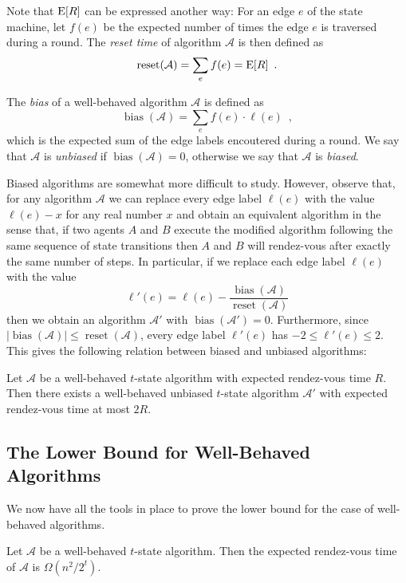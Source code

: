 \documentclass{patmorin}
\newcommand{\A}{\mathcal{A}}
\DeclareMathOperator{\bias}{bias}
\DeclareMathOperator{\reset}{reset}
\begin{document}
Note that $\mathrm{E}[R]$ can be expressed another way: For an edge $e$ of the
state machine, let $f(e)$ be the expected number of times the edge $e$
is traversed during a round.  The
\emph{reset time} of algorithm $\A$ is then defined as
\[
   \reset(\A) = \sum_e f(e) = \E[R] \enspace .
\]

The \emph{bias} of a well-behaved algorithm $\A$ is defined as
\[
    \bias(\A) = \sum_{e} f(e)\cdot\ell(e) \enspace ,
\]
which is the expected sum of the edge labels encoutered during a round.
We say that $\A$ is \emph{unbiased} if $\bias(\A)=0$, otherwise we say
that $\A$ is \emph{biased}.

Biased algorithms are somewhat more difficult to study.  However,
observe that, for any algorithm $\mathcal{A}$ we can replace every
edge label $\ell(e)$ with the value $\ell(e)-x$ for any real number
$x$ and obtain an equivalent algorithm in the sense that, if two
agents $A$ and $B$ execute the modified algorithm following the same
sequence of state transitions then $A$ and $B$ will rendez-vous after
exactly the same number of steps.  In particular, if we replace each
edge label $\ell(e)$ with the value
\[
   \ell'(e) = \ell(e) - \frac{\bias(\A)}{\reset(\A)}
\]
then we obtain an algorithm $\A'$ with $\bias(\A')=0$.  Furthermore, since
$|\bias(\A)|\le\reset(\A)$, every edge label $\ell'(e)$ has
$-2 \le \ell'(e)\le 2$.  This gives the following relation between
biased and unbiased algorithms:

\begin{lem}
Let $\A$ be a well-behaved $t$-state algorithm with expected rendez-vous time
$R$.  Then there exists a well-behaved unbiased $t$-state algorithm $\A'$ with
expected rendez-vous time at most $2R$.
\end{lem}

\subsection{The Lower Bound for Well-Behaved Algorithms}

We now have all the tools in place to prove the lower bound for the
case of well-behaved algorithms.

\begin{lem}
Let $\A$ be a well-behaved $t$-state algorithm.  Then the expected rendez-vous
time of $\A$ is $\Omega(n^2/2^{t})$.
\end{lem}
\end{document}
